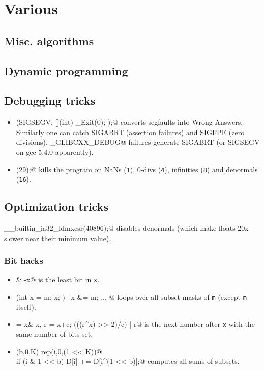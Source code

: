 \chapter{Various}

\section{Misc. algorithms}

\section{Dynamic programming}

\section{Debugging tricks}
	\begin{itemize}
		\item \verb@signal(SIGSEGV, [](int) { _Exit(0); });@ converts segfaults into Wrong Answers.
			Similarly one can catch SIGABRT (assertion failures) and SIGFPE (zero divisions).
			\verb@_GLIBCXX_DEBUG@ failures generate SIGABRT (or SIGSEGV on gcc 5.4.0 apparently).
		\item \verb@feenableexcept(29);@ kills the program on NaNs (\texttt 1), 0-divs (\texttt 4), infinities (\texttt 8) and denormals (\texttt{16}).
	\end{itemize}

\section{Optimization tricks}
	\verb@__builtin_ia32_ldmxcsr(40896);@ disables denormals (which make floats 20x slower near their minimum value).
	\subsection{Bit hacks}
		\begin{itemize}
			\item \verb@x & -x@ is the least bit in \texttt{x}.
			\item \verb@for (int x = m; x; ) { --x &= m; ... }@ loops over all subset masks of \texttt{m} (except \texttt{m} itself).
			\item \verb@c = x&-x, r = x+c; (((r^x) >> 2)/c) | r@ is the next number after \texttt{x} with the same number of bits set.
			\item \verb@rep(b,0,K) rep(i,0,(1 << K))@ \\ \verb@  if (i & 1 << b) D[i] += D[i^(1 << b)];@ computes all sums of subsets.
		\end{itemize}
